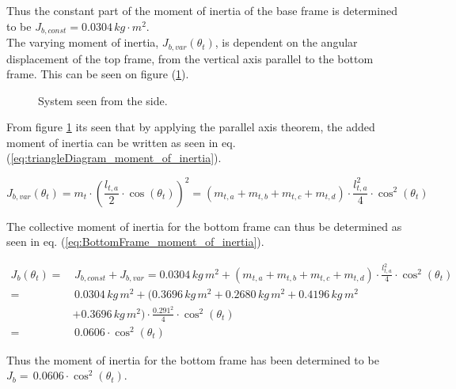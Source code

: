 \documentclass[../../main]{subfiles}
\begin{document}
Thus the constant part of the moment of inertia of the base frame is determined to be $J_{b,const} = 0.0304 \si{\,kg\cdot m^2}$.\\
The varying moment of inertia, $J_{b,var}(\theta_t)$, is dependent on the angular displacement of the top frame, from the vertical axis parallel to the bottom frame. This can be seen on figure (\ref{fig:TrekantDiagram}).

\begin{figure}[H]
  \centering
  \def\svgwidth{0.4\columnwidth}
  
  \caption{System seen from the side.}
  \label{fig:TrekantDiagram}
\end{figure}

From figure \ref{fig:TrekantDiagram} its seen that by applying the parallel axis theorem, the added moment of inertia can be written as seen in eq. (\ref{eq:triangleDiagram_moment_of_inertia}).

\begin{equation}
  \label{eq:triangleDiagram_moment_of_inertia}
  J_{b,var}(\theta_t) = m_{t} \cdot \left( \frac{l_{t,a}}{2} \cdot \cos(\theta_t) \right)^2 = ( m_{t,a} + m_{t,b} + m_{t,c} + m_{t,d} ) \cdot \frac{l_{t,a}^2}{4} \cdot \cos^2(\theta_t)
\end{equation}

The collective moment of inertia for the bottom frame can thus be determined as seen in eq. (\ref{eq:BottomFrame_moment_of_inertia}).

\begin{equation}
  \label{eq:BottomFrame_moment_of_inertia}
\begin{split}
    J_{b}(\theta_t) =& \, J_{b,const} + J_{b,var} = 0.0304 \si{\, kg \, m^2} + ( m_{t,a} + m_{t,b} + m_{t,c} + m_{t,d} ) \cdot \frac{l_{t,a}^2}{4} \cdot \cos^2(\theta_t)\\
    =& \, 0.0304 \si{\, kg \, m^2} + ( 0.3696 \si{\, kg \, m^2} + 0.2680 \si{\, kg \, m^2} + 0.4196 \si{\, kg \, m^2}\\
    &+ 0.3696 \si{\, kg \, m^2}) \cdot \frac{0.291^2}{4} \cdot \cos^2(\theta_t)\\
    =& \, 0.0606\cdot \cos^2(\theta_t)
\end{split}
\end{equation}

Thus the moment of inertia for the bottom frame has been determined to be
\newline $J_{b} = \, 0.0606 \cdot \cos^2(\theta_t)$.
\end{document}
